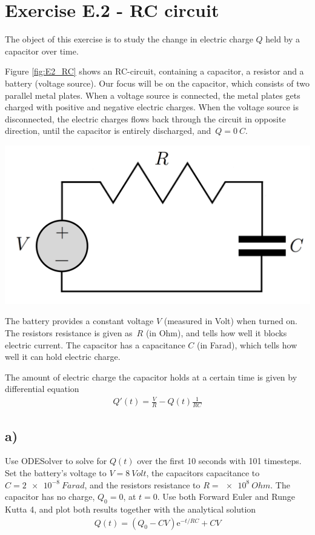 \documentclass[10pt,a4paper]{article}
\renewcommand{\exp}{\mathrm{e}^}
\begin{document}
\section*{Exercise E.2 - RC circuit}
The object of this exercise is to study the change in electric charge $Q$ held by a capacitor over time. 

Figure \ref{fig:E2_RC} shows an RC-circuit, containing a capacitor, a resistor and a battery (voltage source). Our focus will be on the capacitor, which consists of two parallel metal plates. When a voltage source is connected, the metal plates gets charged with positive and negative electric charges. When the voltage source is disconnected, the electric charges flows back through the circuit in opposite direction, until the capacitor is entirely discharged, and $Q = \SI{0}{C}$.


\begin{center}
	\includegraphics[scale=1]{fig_RC-cp1.png}
    \label{fig:E2_RC}
\end{center}

The battery provides a constant voltage $V$ (measured in Volt) when turned on. The resistors resistance is given as $R$ (in Ohm), and tells how well it blocks electric current. The capacitor has a capacitance $C$ (in Farad), which tells how well it can hold electric charge.

The amount of electric charge the capacitor holds at a certain time is given by differential equation
\begin{align}\label{eqn:Qder}
Q'(t) = \frac{V}{R} - Q(t)\frac{1}{RC}
\end{align}

\subsection*{a)}
Use ODESolver to solve for $Q(t)$ over the first 10 seconds with 101 timesteps. Set the battery's voltage to $V = \SI{8}{Volt}$, the capacitors capacitance to $C = \SI{2e-8}{Farad}$, and the resistors resistance to $R = \SI{e8}{Ohm}$. The capacitor has no charge, $Q_0=0$, at $t=0$. Use both Forward Euler and Runge Kutta 4, and plot both results together with the analytical solution
\begin{align}
Q(t) = (Q_0 - CV)\exp{-t/RC} + CV
\end{align}
\end{document}
